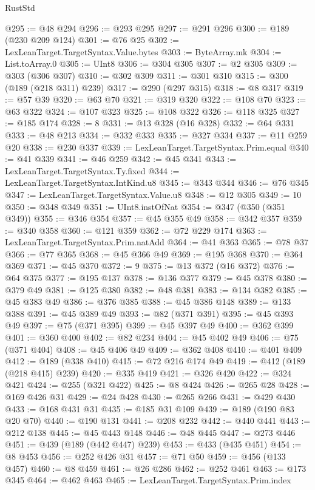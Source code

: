 \begin{lexlean}{RustStd}
\begin{coremodule}
{\begin{coremodule}
{{{{{{{{{{{{{{{@295 := @48 @294
@296 := @293 @295
@297 := @291 @296
@300 := @189 (@230 @209 @124)
@301 := @76 @25
@302 := LexLeanTarget.TargetSyntax.Value.bytes
@303 := ByteArray.mk
@304 := List.toArray.{0}
@305 := UInt8
@306 := @304 @305
@307 := @2 @305
@309 := @303 (@306 @307)
@310 := @302 @309
@311 := @301 @310
@315 := @300 (@189 (@218 @311) @239)
@317 := @290 (@297 @315)
@318 := @8 @317
@319 := @57 @39
@320 := @63 @70
@321 := @319 @320
@322 := @108 @70
@323 := @63 @322
@324 := @107 @323
@325 := @108 @322
@326 := @118 @325
@327 := @185 @174
@328 := 8
@331 := @13 @328 (@16 @328)
@332 := @64 @331
@333 := @48 @213
@334 := @332 @333
@335 := @327 @334
@337 := @11 @259 @20
@338 := @230 @337
@339 := LexLeanTarget.TargetSyntax.Prim.equal
@340 := @41 @339
@341 := @46 @259
@342 := @45 @341
@343 := LexLeanTarget.TargetSyntax.Ty.fixed
@344 := LexLeanTarget.TargetSyntax.IntKind.u8
@345 := @343 @344
@346 := @76 @345
@347 := LexLeanTarget.TargetSyntax.Value.u8
@348 := @12 @305
@349 := 10
@350 := @348 @349
@351 := UInt8.instOfNat
@354 := @347 (@350 (@351 @349))
@355 := @346 @354
@357 := @45 @355 @49
@358 := @342 @357
@359 := @340 @358
@360 := @121 @359
@362 := @72 @229 @174
@363 := LexLeanTarget.TargetSyntax.Prim.natAdd
@364 := @41 @363
@365 := @78 @37
@366 := @77 @365
@368 := @45 @366 @49
@369 := @195 @368
@370 := @364 @369
@371 := @45 @370
@372 := 9
@375 := @13 @372 (@16 @372)
@376 := @64 @375
@377 := @195 @137
@378 := @136 @377
@379 := @45 @378
@380 := @379 @49
@381 := @125 @380
@382 := @48 @381
@383 := @134 @382
@385 := @45 @383 @49
@386 := @376 @385
@388 := @45 @386 @148
@389 := @133 @388
@391 := @45 @389 @49
@393 := @82 (@371 @391)
@395 := @45 @393 @49
@397 := @75 (@371 @395)
@399 := @45 @397 @49
@400 := @362 @399
@401 := @360 @400
@402 := @82 @234
@404 := @45 @402 @49
@406 := @75 (@371 @404)
@408 := @45 @406 @49
@409 := @362 @408
@410 := @401 @409
@412 := @189 (@338 @410)
@415 := @72 @216 @174 @49
@419 := @412 (@189 (@218 @415) @239)
@420 := @335 @419
@421 := @326 @420
@422 := @324 @421
@424 := @255 (@321 @422)
@425 := @8 @424
@426 := @265 @28
@428 := @169 @426 @31
@429 := @24 @428
@430 := @265 @266
@431 := @429 @430
@433 := @168 @431 @31
@435 := @185 @31 @109
@439 := @189 (@190 @83 @20 @70)
@440 := @190 @131
@441 := @208 @232
@442 := @440 @441
@443 := @212 @138
@445 := @45 @443 @148
@446 := @48 @445
@447 := @273 @446
@451 := @439 (@189 (@442 @447) @239)
@453 := @433 (@435 @451)
@454 := @8 @453
@456 := @252 @426 @31
@457 := @71 @50
@459 := @456 (@133 @457)
@460 := @8 @459
@461 := @26 @286
@462 := @252 @461
@463 := @173 @345
@464 := @462 @463
@465 := LexLeanTarget.TargetSyntax.Prim.index
}}}}}}}}}}}}}}}
\end{coremodule}}
\end{coremodule}
\end{lexlean}
